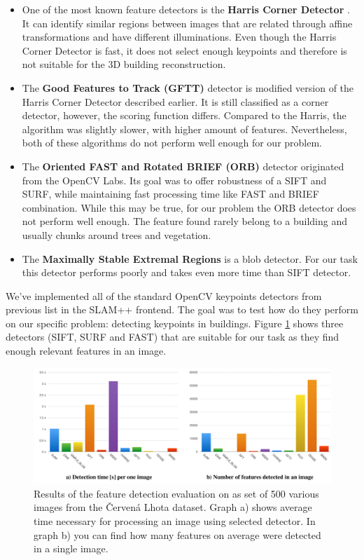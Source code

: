 \begin{itemize}
	\item One of the most known feature detectors is the \textbf{Harris Corner Detector} . It can identify similar regions between images that are related through affine transformations and have different illuminations. Even though the Harris Corner Detector is fast, it does not select enough keypoints and therefore is not suitable for the 3D building reconstruction. \cite{www:harris}
	
	\item The \textbf{Good Features to Track (GFTT)} detector is modified version of the Harris Corner Detector described earlier. It is still classified as a corner detector, however, the scoring function differs. Compared to the Harris, the algorithm was slightly slower, with higher amount of features. Nevertheless, both of these algorithms do not perform well enough for our problem. \cite{article:gftt}
	
	\item The \textbf{Oriented FAST and Rotated BRIEF (ORB)} detector originated from the OpenCV Labs. Its goal was to offer robustness of a SIFT and SURF, while maintaining fast processing time like FAST and BRIEF combination. While this may be true, for our problem the ORB detector does not perform well enough. The feature found rarely belong to a building and usually chunks around trees and vegetation. \cite{www:orb}\cite{article:orb}
	
	\item The \textbf{Maximally Stable Extremal Regions} is a blob detector. For our task this detector performs poorly and takes even more time than SIFT detector.
\end{itemize}

We've implemented all of the standard OpenCV keypoints detectors from previous list in the SLAM++ frontend. The goal was to test how do they perform on our specific problem: detecting keypoints in buildings. Figure \ref{fig:detectors} shows three detectors (SIFT, SURF and FAST) that are suitable for our task as they find enough relevant features in an image. 

\begin{figure}[ht]
	\begin{center}
		\includegraphics[keepaspectratio,width=\textwidth]{fig/detectors.pdf}
	\end{center}
	\caption{Results of the feature detection evaluation on as set of 500 various images from the Červená Lhota dataset. Graph a) shows average time necessary for processing an image using selected detector. In graph b) you can find how many features on average were detected in a single image.}
	\label{fig:detectors}
\end{figure}

